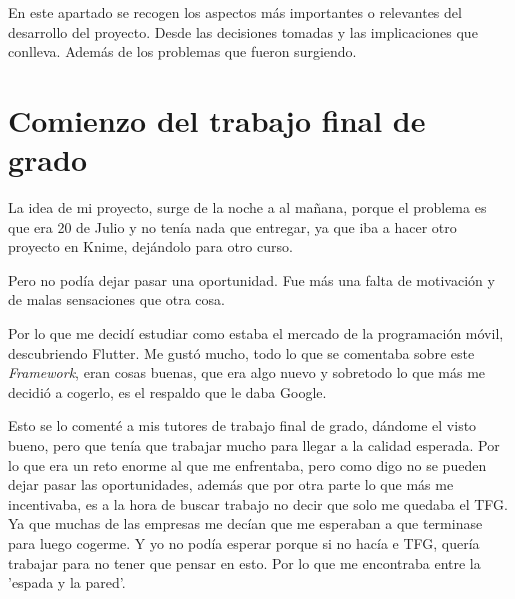 
En este apartado se recogen los aspectos más importantes o relevantes del desarrollo del proyecto. Desde las decisiones tomadas y las implicaciones que conlleva. Además de los problemas que fueron surgiendo.

\section{Comienzo del trabajo final de grado}
La idea de mi proyecto, surge de la noche a al mañana, porque el problema es que era 20 de Julio y no tenía nada que entregar, ya que iba a hacer otro proyecto en Knime, dejándolo para otro curso. 

Pero no podía dejar pasar una oportunidad. Fue más una falta de motivación y de malas sensaciones que otra cosa.

Por lo que me decidí estudiar como estaba el mercado de la programación móvil, descubriendo Flutter. Me gustó mucho, todo lo que se comentaba sobre este \emph{Framework}, eran cosas buenas, que era algo nuevo y sobretodo lo que más me decidió a cogerlo, es el respaldo que le daba Google.

Esto se lo comenté a mis tutores de trabajo final de grado, dándome el visto bueno, pero que tenía que trabajar mucho para llegar a la calidad esperada. Por lo que era un reto enorme al que me enfrentaba, pero como digo no se pueden dejar pasar las oportunidades, además que por otra parte lo que más me incentivaba, es a la hora de buscar trabajo no decir que solo me quedaba el TFG. Ya que muchas de las empresas me decían que me esperaban a que terminase para luego cogerme. Y yo no podía esperar porque si no hacía e TFG, quería trabajar para no tener que pensar en esto. Por lo que me encontraba entre la 'espada y la pared'.